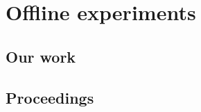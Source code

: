 \chapter{Offline experiments}  \label{chap_offline_experimetns}

\section{Our work}

\section{Proceedings}